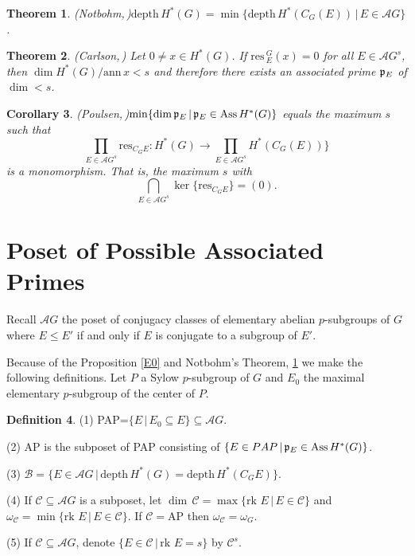 \documentclass[reqno]{amsart}
\theoremstyle{plain}%
\newtheorem{thm}{Theorem}[section]
\newtheorem{cor}[thm]{Corollary}
\theoremstyle{definition}
\newtheorem{defn}[thm]{Definition}
\theoremstyle{remark}
\newcommand\vv{\,\vert\,}
\newcommand\sub{\subseteq}
\newcommand\mc[1]{\mathcal #1}
\newcommand\dph{\text{depth}\,}
\newcommand\as{\text{Ass}\,}
\newcommand\rk{\text{rk }}
\newcommand\p[1]{\frak p_{#1}}
\newcommand\res{\text{res}}
\begin{document}
\begin{thm}(Notbohm,\,\cite{N})\label{Not} $\dph H^*(G)=\min\{\dph H^*(C_G(E))\vv E\in\mathcal AG\}$.\end{thm}

\begin{thm}(Carlson,\,\cite{C}) Let $0\neq x\in H^*(G)$. If $\text{res}\,^G_E(x)=0$ for all $E\in\mathcal AG^s$, then $\dim H^*(G)/\text{ann}\,x< s$ and therefore there exists an associated prime $\frak p_E$ of $\dim<s$.\end{thm}

\begin{cor}(Poulsen,\,\cite{P})\label{Poul} $\min\{\dim \frak p_E\vv \frak p_E\in\as H^*(G)\}$ equals the maximum $s$ such that
$$ \prod_{E\in\mc AG^s}\res_{C_GE}:H^*(G)\to \prod_{E\in\mc AG^s}H^*(C_G(E))\} $$ is a monomorphism. That is, the maximum $s$ with $$\bigcap_{E\in\mc AG^s}\ker\{\res_{C_GE}\}=(0).$$
\end{cor}
 
\section*{Poset of Possible Associated Primes}

Recall $\mc AG$ the poset of conjugacy classes of elementary abelian $p$-subgroups of $G$
 where $E\leq E'$ if and only if $E$ is conjugate to a subgroup of $E'$.

Because of the Proposition \ref{E0} and Notbohm's Theorem, \ref{Not} we make the following definitions.  Let $P$ a Sylow $p$-subgroup of $G$ and $E_0$ the maximal elementary $p$-subgroup of the center of $P$.

\begin{defn}(1) PAP=$\{E\vv E_0\sub E\}\sub\mc AG$.
\par (2) AP is the subposet of PAP consisting of $\{E\in PAP\vv \p E\in\as H^*(G)\}$.
\par (3) $\mc B=\{E\in\mc AG\vv \dph H^*(G)=\dph H^*(C_GE)\}$.
\par (4) If $\mc C\sub \mc  AG$ is a subposet, let $\dim\,\mc C=\max\{\rk E\vv E\in\mc C\}$ and $\omega_\mc C=\min\{\rk E\vv E\in\mc C\}$.  If $\mc C=$AP then $\omega_\mc C=\omega_G$.
\par (5) If $\mc C\sub\mc AG$, denote $\{E\in\mc C\vv \rk E=s\}$ by $\mc C^s$.
\end{defn}
\end{document}
